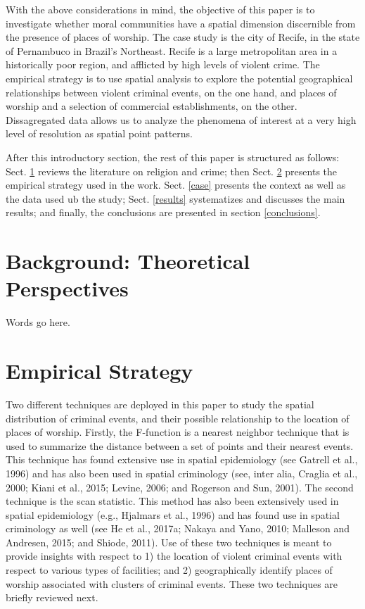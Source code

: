 \documentclass[smallextended]{svjour3}       %
\begin{document}
With the above considerations in mind, the objective of this paper is to
investigate whether moral communities have a spatial dimension
discernible from the presence of places of worship. The case study is
the city of Recife, in the state of Pernambuco in Brazil's Northeast.
Recife is a large metropolitan area in a historically poor region, and
afflicted by high levels of violent crime. The empirical strategy is to
use spatial analysis to explore the potential geographical relationships
between violent criminal events, on the one hand, and places of worship
and a selection of commercial establishments, on the other.
Dissagregated data allows us to analyze the phenomena of interest at a
very high level of resolution as spatial point patterns.

After this introductory section, the rest of this paper is structured as
follows: Sect. \ref{background} reviews the literature on religion and
crime; then Sect. \ref{methods} presents the empirical strategy used in
the work. Sect. \ref{case} presents the context as well as the data used
ub the study; Sect. \ref{results} systematizes and discusses the main
results; and finally, the conclusions are presented in section
\ref{conclusions}.

\hypertarget{background}{%
\section{Background: Theoretical Perspectives}\label{background}}

Words go here.

\hypertarget{methods}{%
\section{Empirical Strategy}\label{methods}}

Two different techniques are deployed in this paper to study the spatial
distribution of criminal events, and their possible relationship to the
location of places of worship. Firstly, the F-function is a nearest
neighbor technique that is used to summarize the distance between a set
of points and their nearest events. This technique has found extensive
use in spatial epidemiology (see Gatrell et al., 1996) and has also been
used in spatial criminology (see, inter alia, Craglia et al., 2000;
Kiani et al., 2015; Levine, 2006; and Rogerson and Sun, 2001). The
second technique is the scan statistic. This method has also been
extensively used in spatial epidemiology (e.g., Hjalmars et al., 1996)
and has found use in spatial criminology as well (see He et al., 2017a;
Nakaya and Yano, 2010; Malleson and Andresen, 2015; and Shiode, 2011).
Use of these two techniques is meant to provide insights with respect to
1) the location of violent criminal events with respect to various types
of facilities; and 2) geographically identify places of worship
associated with clusters of criminal events. These two techniques are
briefly reviewed next.
\end{document}
